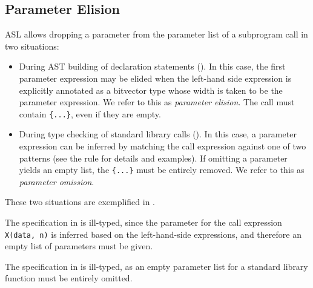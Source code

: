 \begin{mathpar}
\end{mathpar}

\subsection{Parameter Elision\label{sec:ParameterElision}}

ASL allows dropping a parameter from the parameter list of a subprogram call
in two situations:
\begin{itemize}
  \item During AST building of declaration statements
        ().
        In this case, the first parameter expression may be elided when the left-hand side
        expression is explicitly annotated as a bitvector type whose width is taken to be the parameter expression.
        We refer to this as \emph{parameter elision}.
        The call must contain \verb|{...}|, even if they are empty.
  \item During type checking of standard library calls ().
        In this case, a parameter expression can be inferred by matching the call expression
        against one of two patterns (see the rule for details and examples).
        If omitting a parameter yields an empty list, the \verb|{...}| must be entirely removed.
        We refer to this as \emph{parameter omission}.
\end{itemize}

These two situations are exemplified in .

The specification in  is ill-typed,
since the parameter for the call expression \verb|X(data, n)| is inferred based on the left-hand-side
expressions, and therefore an empty list of parameters must be given.

The specification in  is ill-typed,
as an empty parameter list for a standard library function must be entirely omitted.

